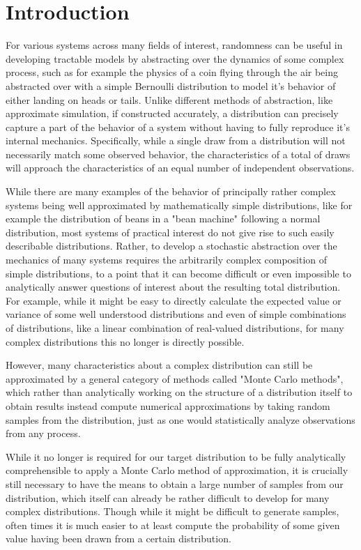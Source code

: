 \section{Introduction}

For various systems across many fields of interest, randomness can be useful in developing tractable models by abstracting over the dynamics of some complex process, such as for example the physics of a coin flying through the air being abstracted over with a simple Bernoulli distribution to model it's behavior of either landing on heads or tails. Unlike different methods of abstraction, like approximate simulation, if constructed accurately, a distribution can precisely capture a part of the behavior of a system without having to fully reproduce it's internal mechanics. Specifically, while a single draw from a distribution will not necessarily match some observed behavior, the characteristics of a total of draws will approach the characteristics of an equal number of independent observations.

While there are many examples of the behavior of principally rather complex systems being well approximated by mathematically simple distributions, like for example the distribution of beans in a "bean machine" following a normal distribution, most systems of practical interest do not give rise to such easily describable distributions. Rather, to develop a stochastic abstraction over the mechanics of many systems requires the arbitrarily complex composition of simple distributions, to a point that it can become difficult or even impossible to analytically answer questions of interest about the resulting total distribution. For example, while it might be easy to directly calculate the expected value or variance of some well understood distributions and even of simple combinations of distributions, like a linear combination of real-valued distributions, for many complex distributions this no longer is directly possible.

However, many characteristics about a complex distribution can still be approximated by a general category of methods called "Monte Carlo methods", which rather than analytically working on the structure of a distribution itself to obtain results instead compute numerical approximations by taking random samples from the distribution, just as one would statistically analyze observations from any process.

While it no longer is required for our target distribution to be fully analytically comprehensible to apply a Monte Carlo method of approximation, it is crucially still necessary to have the means to obtain a large number of samples from our distribution, which itself can already be rather difficult to develop for many complex distributions. Though while it might be difficult to generate samples, often times it is much easier to at least compute the probability of some given value having been drawn from a certain distribution.

